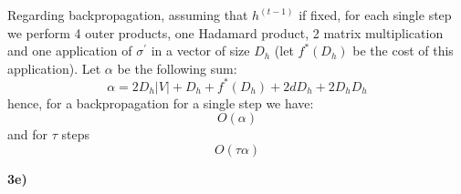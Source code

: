 \documentclass{article}
\begin{document}
Regarding backpropagation, assuming that $h^{(t-1)}$ if fixed, for each single step we perform 4 outer products, one Hadamard product, 2 matrix multiplication and one application of $\sigma^{\prime}$ in a vector of size $D_h$ (let $f^{*}(D_h)$ be the cost of this application). Let $\alpha$ be the following sum: 
\begin{equation}\label{eq:53}
\alpha = 2D_h|V| +D_h + f^{*}(D_h)+ 2dD_h + 2D_hD_h
\end{equation}
hence, for a backpropagation for a single step we have:
\begin{equation}\label{eq:54}
O(\alpha)
\end{equation}
and for $\tau$ steps
\begin{equation}\label{eq:55}
O(\tau\alpha)
\end{equation}

\textbf{3e)}
\end{document}
